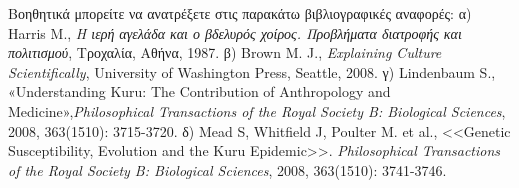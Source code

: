 \begin{refsection}
\begin{exercises}[Εργασίες]
\begin {itemize}
\end{itemize}
\begin{writesolutionsII}
Βοηθητικά μπορείτε να ανατρέξετε στις παρακάτω βιβλιογραφικές αναφορές:
α) Harris M., \textit{Η ιερή αγελάδα και ο βδελυρός χοίρος. Προβλήματα διατροφής και πολιτισμού}, Τροχαλία, Αθήνα, 1987.
β) Brown M. J., \textit{Explaining Culture Scientifically}, University of Washington Press, Seattle, 2008.
γ) Lindenbaum S., «Understanding Kuru: The Contribution of Anthropology and Medicine»,\textit{Phi\-lo\-so\-phi\-cal Transactions of the Royal Society B: Biological Sciences}, 2008, 363(1510): 3715-3720.
δ) Mead S, Whitfield J, Poulter M. et al., <<Genetic Susceptibility, Evolution and the Kuru Epidemic>>. \textit{Philosophical Transactions of the Royal Society B: Biological Sciences}, 2008, 363(1510): 3741-3746.
\end{writesolutionsII}
\end{exercises}
\closesolutionsII

\printbibliography[heading=biboption]
\end{refsection}
